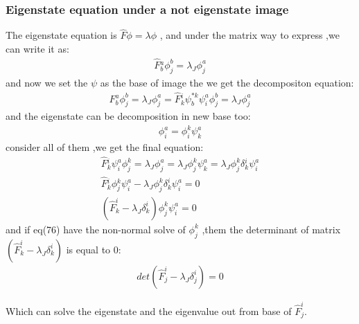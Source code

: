 \documentclass{article}
\begin{document}
\subsubsection{Eigenstate equation under a not eigenstate image}
The eigenstate equation is $\hat F\phi=\lambda\phi$ , and under the matrix way to express ,we can write it as:\begin{align}\hat F{^a_b}\phi^b_j=\lambda_J\phi_j^a\end{align}and now we set the $\psi$ as the base of image the we get the decompositon equation:
\begin{align}
  \hat F{^a_b}\phi^b_j=\lambda_J\phi_j^a=\hat F{^i_k}\psi^{*k}_b\psi_i^a\phi_j^b=\lambda_J\phi^a_j
\end{align}
and the eigenstate can be decomposition in new base too:\begin{align}\phi_i^a=\phi_i^k\psi_k^a\end{align}
consider all of them ,we get the final equation:
\begin{align}
  \hat F{^i_k}\psi^a_i\phi^k_j=\lambda_J\phi^a_j=\lambda_J\phi_j^k\psi_k^a=\lambda_J\phi^k_j \delta {^i_k}\psi_i^a\\
  \hat F{^i_k}\phi{^k_j}\psi_i^a-\lambda_J\phi^k_j \delta ^i_k\psi^a_i=0\\
  (\hat F^i_k-\lambda_J \delta ^i_k)\phi^k_j\psi^a_i=0
\end{align}
and if eq(76) have the non-normal solve of $\phi^k_j$ ,them the determinant of matrix $(\hat F^i_k-\lambda_J \delta ^i_k)$ is equal to 0:
\begin{align}
det(\hat F^i_j-\lambda_J \delta ^i_j)=0
\end{align}

Which can solve the eigenstate and the eigenvalue out from base of $\hat F^i_j$.
\end{document}

